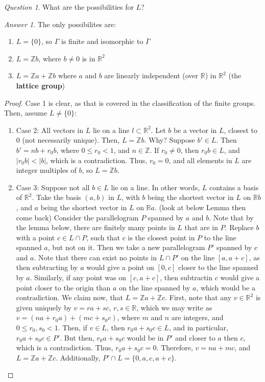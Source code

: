 \documentclass[12pt]{article}
\theoremstyle{definition}
\theoremstyle{remark}
\newtheorem*{qst}{Question}
\newtheorem*{ans}{Answer}
\numberwithin{equation}{section}
\newcommand\R{\mathbb R}    %
\newcommand\Z{\mathbb Z}    %
\newcommand\B[1]{\textbf{ #1}}
\begin{document}
\vspace{15pt}
\begin{qst}
        What are the possibilities for $L$?
\end{qst}
\begin{ans}
        The only possibilites are: \begin{enumerate}
                \item $L =\{0\}$, so $\Gamma$ is finite and isomorphic to $\overline{\Gamma}$
                \item $L = \Z b$, where $b\neq 0$ is in $\R^2$
                \item $L = \Z a + \Z b$ where $a$ and $b$ are linearly independent (over $\R$) in $\R^2$ (the \B{lattice group})
        \end{enumerate}
\end{ans}
\begin{proof}
        Case 1 is clear, as that is covered in the classification of the finite groups. Then, assume $L \neq \{0\}$: \begin{enumerate}
                \item[] Case 2: All vectors in $L$ lie on a line $l \subset \R^2$. Let $b$ be a vector in $L$, closest to $0$ (not necessarily unique). Then, $L = \Z b$. Why? Suppose $b' \in L$. Then $b' = nb + r_0b$, where $0\leq r_0 < 1$, and $n \in \Z$. If $r_0 \neq 0$, then $r_0b \in L$, and $|r_0b| < |b|$, which is a contradiction. Thus, $r_0 = 0$, and all elements in $L$ are integer multiples of $b$, so $L = \Z b$.
                \item[] Case 3: Suppose not all $b \in L$ lie on a line. In other words, $L$ contains a basis of $\R^2$. Take the basis $(a,b)$ in $L$, with $b$ being the shortest vector in $L$ on $\R b$, and $a$ being the shortest vector in $L$ on $\R a$. (look at below Lemma then come back) Consider the parallelogram $P$ spanned by $a$ and $b$. Note that by the lemma below, there are finitely many points in $L$ that are in $P$. Replace $b$ with a point $c \in L\cap P$, such that c is the closest point in $P$ to the line spanned $a$, but not on it. Then we take a new parallelogram $P'$ spanned by $c$ and $a$. Note that there can exist no points in $L\cap P'$ on the line $[a,a+c]$, as then subtracting by $a$ would give a point on $[0,c]$ closer to the line spanned by $a$. Similarly, if any point was on $[c,a+c]$, then subtractin $c$ would give a point closer to the origin than $a$ on the line spanned by $a$, which would be a contradiction. We claim now, that $L = \Z a+ \Z c$. First, note that any $v\in\R^2$ is given uniquely by $v = ra+sc$, $r,s \in \R$, which we may write as $v = (na+r_0a)+(mc+s_0c)$, where $m$ and $n$ are integers, and $0\leq r_0,s_0 < 1$. Then, if $v \in L$, then $r_0a + s_0c \in L$, and in particular, $r_0a+s_0c \in P'$. But then, $r_0a+s_0c$ would be in $P'$ and closer to $a$ then $c$, which is a contradiction. Thus, $r_0a+s_0c = 0$. Therefore, $v = na+mc$, and $L = \Z a + \Z c$. Additionally, $P'\cap L = \{0,a,c,a+c\}$.
        \end{enumerate}
\end{proof}
\end{document}

